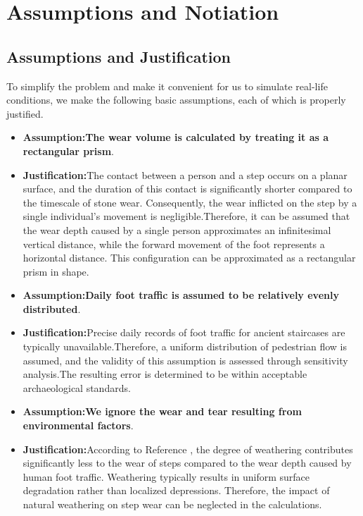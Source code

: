 \documentclass{mcmthesis}
\begin{document}
\section{Assumptions and Notiation}
\subsection{Assumptions and Justification}

\hspace{1.5em}To simplify the problem and make it convenient for us to simulate real-life conditions, we make the following basic assumptions, each of which is properly justified.

\begin{itemize}
\item {\bf Assumption:The wear volume is calculated by treating it as a rectangular prism}. 
\item {\bf Justification:}The contact between a person and a step occurs on a planar surface, and the duration of this contact is significantly shorter compared to the timescale of stone wear. Consequently, the wear inflicted on the step by a single individual's movement is negligible.Therefore, it can be assumed that the wear depth caused by a single person approximates an infinitesimal vertical distance, while the forward movement of the foot represents a horizontal distance. This configuration can be approximated as a rectangular prism in shape.

\item {\bf Assumption:Daily foot traffic is assumed to be relatively evenly distributed}. 
\item {\bf Justification:}Precise daily records of foot traffic for ancient staircases are typically unavailable.Therefore, a uniform distribution of pedestrian flow is assumed, and the validity of this assumption is assessed through sensitivity analysis.The resulting error is determined to be within acceptable archaeological standards.

\item {\bf Assumption:We ignore the wear and tear resulting from environmental factors}. 
\item {\bf Justification:}According to Reference \cite{3}, the degree of weathering contributes significantly less to the wear of steps compared to the wear depth caused by human foot traffic. Weathering typically results in uniform surface degradation rather than localized depressions. Therefore, the impact of natural weathering on step wear can be neglected in the calculations.



\end{itemize}
\end{document}

